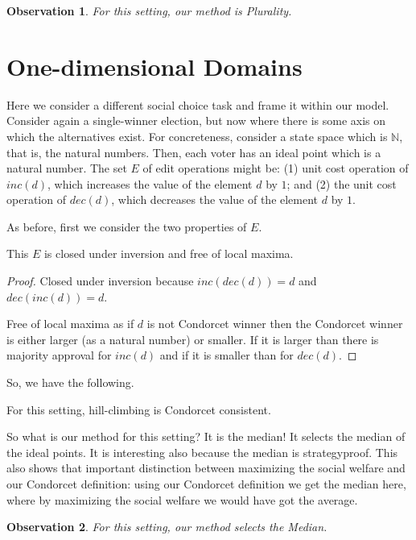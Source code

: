 \documentclass[sigconf]{aamas}  %
\newtheorem{observation}{Observation}
\begin{document}
\begin{observation}
  For this setting, our method is Plurality.
\end{observation}


\section{One-dimensional Domains}

Here we consider a different social choice task and frame it within our model. Consider again a single-winner election, but now where there is some axis on which the alternatives exist. For concreteness, consider a state space which is $\mathbb{N}$, that is, the natural numbers. Then, each voter has an ideal point which is a natural number. The set $E$ of edit operations might be:
  (1) unit cost operation of $inc(d)$, which increases the value of the element $d$ by $1$;
  and
  (2) the unit cost operation of $dec(d)$, which decreases the value of the element $d$ by $1$.

As before, first we consider the two properties of $E$.

\begin{lemma}
  This $E$ is closed under inversion and free of local maxima.
\end{lemma}

\begin{proof}
%
Closed under inversion because $inc(dec(d)) = d$ and $dec(inc(d)) = d$.

Free of local maxima as if $d$ is not Condorcet winner then the Condorcet winner is either larger (as a natural number) or smaller. If it is larger than there is majority approval for $inc(d)$ and if it is smaller than for $dec(d)$.
%
\end{proof}

So, we have the following.

\begin{corollary}
  For this setting, hill-climbing is Condorcet consistent.
\end{corollary}

So what is our method for this setting? It is the median! It selects the median of the ideal points.
It is interesting also because the median is strategyproof.
This also shows that important distinction between maximizing the social welfare and our Condorcet definition:
  using our Condorcet definition we get the median here, where by maximizing the social welfare we would have got the average.

\begin{observation}
  For this setting, our method selects the Median.
\end{observation}
\end{document}
